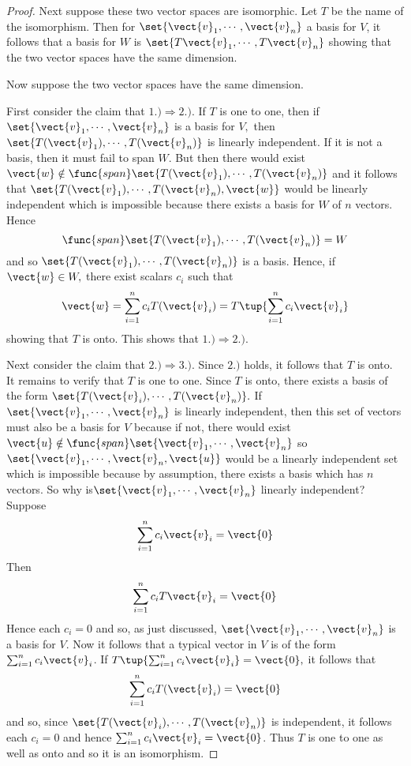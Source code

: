 \begin{proof}
Next suppose these two vector spaces are isomorphic. Let $T$ be the name of
the isomorphism. Then for $\set{\vect{v}_{1},\cdots ,\vect{v}_{n}} $
a basis for $V$, it follows that a basis for $W$
is $\set{T\vect{v}_{1},\cdots ,T\vect{v}_{n}} $ showing that the two
vector spaces have the same dimension.

Now suppose the two vector spaces have the same dimension.

First consider the claim that $1.)\Rightarrow 2.).$ If $T$ is one to one,
then if $\set{\vect{v}_{1},\cdots ,\vect{v}
_{n}} $ is a basis for $V,$ then $\set{T(\vect{v}_{1}),\cdots ,T(\vect{v
}_{n})} $ is linearly independent. If it is not a basis, then it must
fail to span $W$. But then there would exist $\vect{w}\notin \func{span}
\set{T(\vect{v}_{1}),\cdots ,T(\vect{v}_{n})} $ and it follows that $
\set{T(\vect{v}_{1}),\cdots ,T(\vect{v}_{n}),\vect{w}} $ would be
linearly independent which is impossible because there exists a basis for $W$
of $n$ vectors. Hence 
\[
\func{span}\set{T(\vect{v}_{1}),\cdots ,T(\vect{v}
_{n})} =W
\]
and so $\set{T(\vect{v}_{1}),\cdots ,T(\vect{v}_{n})} $
is a basis. Hence, if $\vect{w}\in W,$ there exist scalars $c_{i}$ such that 
\begin{equation*}
\vect{w}=\sum_{i=1}^{n}c_{i}T(\vect{v}_{i})=T\tup{\sum_{i=1}^{n}c_{i}\vect{v}
_{i}}
\end{equation*}
showing that $T$ is onto. This shows that $1.)\Rightarrow 2.).$

Next consider the claim that $2.)\Rightarrow 3.).$ Since $2.)$ holds, it
follows that $T$ is onto. It remains to verify that $T$ is one to one. Since 
$T$ is onto, there exists a basis of the form $\set{T(\vect{v}_{i}),\cdots ,T
(\vect{v}_{n})} .$ If $\set{\vect{v}_{1},\cdots ,\vect{v}_{n}} $
is linearly independent, then this set of vectors must also be a basis for $
V $ because if not, there would exist $\vect{u}\notin \func{span}\set{\vect{
v}_{1},\cdots ,\vect{v}_{n}} $ so $\set{\vect{v}_{1},\cdots ,\vect{v}
_{n},\vect{u}} $ would be a linearly independent set which is
impossible because by assumption, there exists a basis which has $n$
vectors. So why is$\set{\vect{v}_{1},\cdots ,\vect{v}_{n}} $
linearly independent? Suppose 
\begin{equation*}
\sum_{i=1}^{n}c_{i}\vect{v}_{i}=\vect{0}
\end{equation*}
Then
\begin{equation*}
\sum_{i=1}^{n}c_{i}T\vect{v}_{i}=\vect{0}
\end{equation*}
Hence each $c_{i}=0$ and so, as just discussed, $\set{\vect{v}_{1},\cdots ,
\vect{v}_{n}} $ is a basis for $V$. Now it follows that a typical
vector in $V$ is of the form $\sum_{i=1}^{n}c_{i}\vect{v}_{i}$. If $T\tup{
\sum_{i=1}^{n}c_{i}\vect{v}_{i}} =\vect{0},$ it follows that 
\begin{equation*}
\sum_{i=1}^{n}c_{i}T(\vect{v}_{i})=\vect{0}
\end{equation*}
and so, since $\set{T(\vect{v}_{i}),\cdots ,T(\vect{v}_{n})} $ is
independent, it follows each $c_{i}=0$ and hence $\sum_{i=1}^{n}c_{i}\vect{v}
_{i}=\vect{0}$. Thus $T$ is one to one as well as onto and so it is an
isomorphism.


\end{proof}
